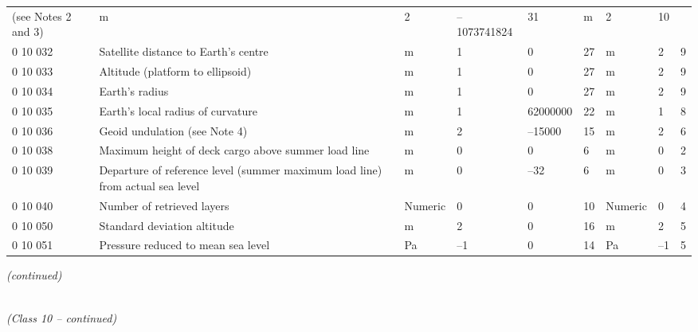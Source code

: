 \begin{longtable}[]{@{}lllllllll@{}}
\begin{minipage}[t]{0.08\columnwidth}
(see Notes 2 and 3)\strut
\end{minipage} & \begin{minipage}[t]{0.08\columnwidth}\raggedright
m\strut
\end{minipage} & \begin{minipage}[t]{0.08\columnwidth}\raggedright
2\strut
\end{minipage} & \begin{minipage}[t]{0.08\columnwidth}\raggedright
--1073741824\strut
\end{minipage} & \begin{minipage}[t]{0.08\columnwidth}\raggedright
31\strut
\end{minipage} & \begin{minipage}[t]{0.08\columnwidth}\raggedright
m\strut
\end{minipage} & \begin{minipage}[t]{0.08\columnwidth}\raggedright
2\strut
\end{minipage} & \begin{minipage}[t]{0.08\columnwidth}\raggedright
10\strut
\end{minipage}\tabularnewline
0 10 032 & Satellite distance to Earth's centre & m & 1 & 0 & 27 & m & 2 & 9\tabularnewline
0 10 033 & Altitude (platform to ellipsoid) & m & 1 & 0 & 27 & m & 2 & 9\tabularnewline
0 10 034 & Earth's radius & m & 1 & 0 & 27 & m & 2 & 9\tabularnewline
0 10 035 & Earth's local radius of curvature & m & 1 & 62000000 & 22 & m & 1 & 8\tabularnewline
0 10 036 & Geoid undulation (see Note 4) & m & 2 & --15000 & 15 & m & 2 & 6\tabularnewline
0 10 038 & Maximum height of deck cargo above summer load line & m & 0 & 0 & 6 & m & 0 & 2\tabularnewline
0 10 039 & Departure of reference level (summer maximum load line) from actual sea level & m & 0 & --32 & 6 & m & 0 & 3\tabularnewline
0 10 040 & Number of retrieved layers & Numeric & 0 & 0 & 10 & Numeric & 0 & 4\tabularnewline
0 10 050 & Standard deviation altitude & m & 2 & 0 & 16 & m & 2 & 5\tabularnewline
0 10 051 & Pressure reduced to mean sea level & Pa & --1 & 0 & 14 & Pa & --1 & 5\tabularnewline
\bottomrule
\end{longtable}

\emph{(continued)}

\emph{\\
(Class 10 -- continued)}

